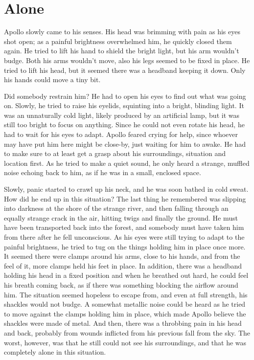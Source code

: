 \chapter{Alone}
\label{cha:alone}
Apollo slowly came to his senses. His head was brimming with pain as his eyes shot open; as a painful brightness overwhelmed him, he quickly closed them again. He tried to lift his hand to shield the bright light, but his arm wouldn't budge. Both his arms wouldn't move, also his legs seemed to be fixed in place. He tried to lift his head, but it seemed there was a headband keeping it down. Only his hands could move a tiny bit.

Did somebody restrain him? He had to open his eyes to find out what was going on. Slowly, he tried to raise his eyelids, squinting into a bright, blinding light. It was an unnaturally cold light, likely produced by an artificial lamp, but it was still too bright to focus on anything. Since he could not even rotate his head, he had to wait for his eyes to adapt. Apollo feared crying for help, since whoever may have put him here might be close-by, just waiting for him to awake. He had to make sure to at least get a grasp about his surroundings, situation and location first. As he tried to make a quiet sound, he only heard a strange, muffled noise echoing back to him, as if he was in a small, enclosed space.

Slowly, panic started to crawl up his neck, and he was soon bathed in cold sweat. How did he end up in this situation? The last thing he remembered was slipping into darkness at the shore of the strange river, and then falling through an equally strange crack in the air, hitting twigs and finally the ground. He must have been transported back into the forest, and somebody must have taken him from there after he fell unconscious. As his eyes were still trying to adapt to the painful brightness, he tried to tug on the things holding him in place once more. It seemed there were clamps around his arms, close to his hands, and from the feel of it, more clamps held his feet in place. In addition, there was a headband holding his head in a fixed position and when he breathed out hard, he could feel his breath coming back, as if there was something blocking the airflow around him. The situation seemed hopeless to escape from, and even at full strength, his shackles would not budge. A somewhat metallic noise could be heard as he tried to move against the clamps holding him in place, which made Apollo believe the shackles were made of metal. And then, there was a throbbing pain in his head and back, probably from wounds inflicted from his previous fall from the sky. The worst, however, was that he still could not see his surroundings, and that he was completely alone in this situation.


